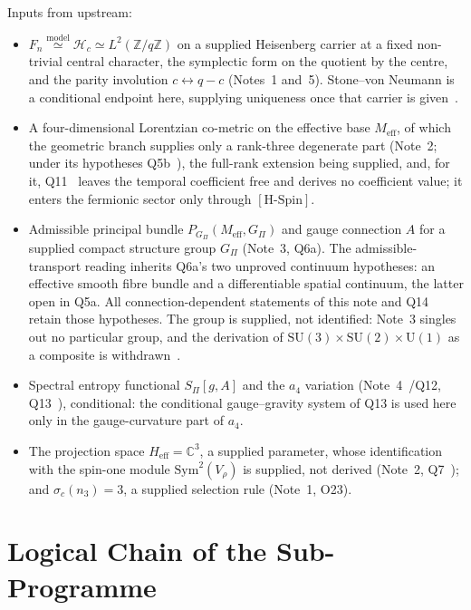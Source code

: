 \documentclass[11pt,a4paper]{article}
\theoremstyle{definition}
\newcommand{\SU}{\mathrm{SU}}
\newcommand{\UU}{\mathrm{U}}
\newcommand{\SPI}{S_\Pi}
\newcommand{\Vr}{V_\rho}
\newcommand{\HSpin}{\ensuremath{[\mathrm{H\text{-}Spin}]}}
\begin{document}
    Inputs from upstream:
    \begin{itemize}
      \item $F_n \overset{\mathrm{model}}{\simeq} \mathcal{H}_c \simeq L^2(\mathbb{Z}/q\mathbb{Z})$ on a supplied Heisenberg carrier at
      a fixed non-trivial central character, the symplectic form on the quotient by the centre, and the parity involution $c \leftrightarrow q-c$ (Notes~1 and~5).
      Stone--von Neumann is a conditional endpoint here, supplying uniqueness once that carrier is
      given~\cite{Beau2026m, Beau2026HeisenbergStructure}.
      \item A four-dimensional Lorentzian co-metric on the effective base $M_{\mathrm{eff}}$, of which the geometric
      branch supplies only a rank-three degenerate part (Note~2; under its hypotheses Q5b~\cite{Beau2026q5b}), the
      full-rank extension being supplied, and, for it, Q11~\cite{Beau2026q11} leaves the temporal coefficient free
      and derives
      no coefficient value;
      it enters the fermionic sector only through \HSpin{}.
      \item Admissible principal bundle $P_{G_\Pi}(M_{\mathrm{eff}}, G_\Pi)$ and gauge connection $A$
      for a supplied compact structure group $G_\Pi$ (Note~3, Q6a).
      The admissible-transport reading inherits Q6a's two unproved continuum hypotheses: an effective
      smooth fibre bundle and a differentiable spatial continuum, the latter open in Q5a.
      All connection-dependent statements of this note and Q14 retain those hypotheses.
      The group is supplied, not identified: Note~3 singles out no particular group, and the
      derivation of $\SU(3) \times \SU(2) \times \UU(1)$ as a composite is
      withdrawn~\cite{Beau2026a35}.
      \item Spectral entropy functional $\SPI[g,A]$ and the $a_4$ variation (Note~4~\cite{Beau2026sgnote}/Q12,
      Q13~\cite{Beau2026q13}), conditional: the conditional gauge--gravity system of Q13 is used here only in the
      gauge-curvature part of $a_4$.
      \item The projection space $H_{\mathrm{eff}} = \mathbb{C}^3$, a supplied parameter, whose identification with
      the spin-one module $\mathrm{Sym}^2(\Vr)$ is supplied, not derived (Note~2, Q7~\cite{Beau2026q7}); and
      $\sigma_c(n_3) = 3$, a supplied selection rule (Note~1, O23).
    \end{itemize}

  \section{Logical Chain of the Sub-Programme}
    \label{sec:chain}
\end{document}
